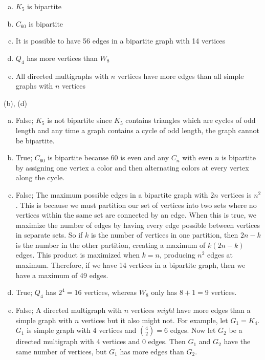\newpage
\begin{enumerate}[(a)]
	\item  $K_5$ is bipartite
    
	\item  $C_{60}$ is bipartite
    
	\item  It is possible to have 56 edges in a bipartite graph with 14 vertices
    
	\item  $Q_4$ has more vertices than $W_8$
    
	\item  All directed multigraphs with $n$ vertices have more edges than all simple graphs with $n$ vertices 

\end{enumerate}
\begin{solution}

(b), (d)\\
\begin{enumerate}[a)]
    \item False; $K_5$ is not bipartite since $K_5$ contains triangles which are cycles of odd length and any time a graph contains a cycle of odd length, the graph cannot be bipartite.
    \item True; $C_{60}$ is bipartite because $60$ is even and any $C_{n}$ with even $n$ is bipartite by assigning one vertex a color and then alternating colors at every vertex along the cycle.
    \item False; The maximum possible edges in a bipartite graph with $2n$ vertices is $n^2$. This is because we must partition our set of vertices into two sets where no vertices within the same set are connected by an edge. When this is true, we maximize the number of edges by having every edge possible between vertices in separate sets. So if $k$ is the number of vertices in one partition, then $2n - k$ is the number in the other partition, creating a maximum of $k(2n - k)$ edges. This product is maximized when $k = n$, producing $n^2$ edges at maximum. Therefore, if we have 14 vertices in a bipartite graph, then we have a maximum of 49 edges.
    \item True; $Q_4$ has $2^4 = 16$ vertices, whereas $W_8$ only has $8 + 1 = 9$ vertices.
    \item False; A directed multigraph with $n$ vertices \textit{might} have more edges than a simple graph with $n$ vertices but it also might not. For example, let $G_1 = K_4$. $G_1$ is simple graph with 4 vertices and $\binom{4}{2} = 6$ edges. Now let $G_2$ be a directed multigraph with 4 vertices and 0 edges. Then $G_1$ and $G_2$ have the same number of vertices, but $G_1$ has more edges than $G_2$.
\end{enumerate}

\end{solution}


